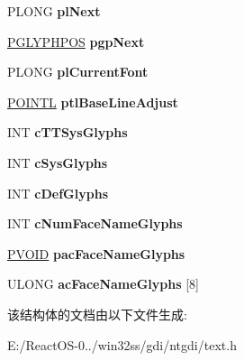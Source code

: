 \begin{DoxyCompactItemize}
P\+L\+O\+NG {\bfseries pl\+Next}
\item 
\mbox{\label{struct___s_t_r_g_d_i_ac5806b486bd15e194e6819e16d6ab072}} 
\hyperlink{struct___g_l_y_p_h_p_o_s}{P\+G\+L\+Y\+P\+H\+P\+OS} {\bfseries pgp\+Next}
\item 
\mbox{\label{struct___s_t_r_g_d_i_a44838bafdac56adc646e57c5eca35417}} 
P\+L\+O\+NG {\bfseries pl\+Current\+Font}
\item 
\mbox{\label{struct___s_t_r_g_d_i_a6e12cf3f2a3a756c23867f9e849cc427}} 
\hyperlink{struct___p_o_i_n_t_l}{P\+O\+I\+N\+TL} {\bfseries ptl\+Base\+Line\+Adjust}
\item 
\mbox{\label{struct___s_t_r_g_d_i_aafe625c3dc0947d75c477379f92cf5a9}} 
I\+NT {\bfseries c\+T\+T\+Sys\+Glyphs}
\item 
\mbox{\label{struct___s_t_r_g_d_i_ac99e50fc8b1638164976d1e279befb1f}} 
I\+NT {\bfseries c\+Sys\+Glyphs}
\item 
\mbox{\label{struct___s_t_r_g_d_i_a92b6633ae491dc88977928c91c62a04f}} 
I\+NT {\bfseries c\+Def\+Glyphs}
\item 
\mbox{\label{struct___s_t_r_g_d_i_a2964770838064bf750cd49cfb88ed52f}} 
I\+NT {\bfseries c\+Num\+Face\+Name\+Glyphs}
\item 
\mbox{\label{struct___s_t_r_g_d_i_a8517557ee6cf46ea89e5b6243b1bb0e7}} 
\hyperlink{interfacevoid}{P\+V\+O\+ID} {\bfseries pac\+Face\+Name\+Glyphs}
\item 
\mbox{\label{struct___s_t_r_g_d_i_a3f9d764a547bc1e289c226a58ef401ed}} 
U\+L\+O\+NG {\bfseries ac\+Face\+Name\+Glyphs} \mbox{[}8\mbox{]}
\end{DoxyCompactItemize}


该结构体的文档由以下文件生成\+:\begin{DoxyCompactItemize}
\item 
E\+:/\+React\+O\+S-\/0../win32ss/gdi/ntgdi/text.\+h\end{DoxyCompactItemize}
